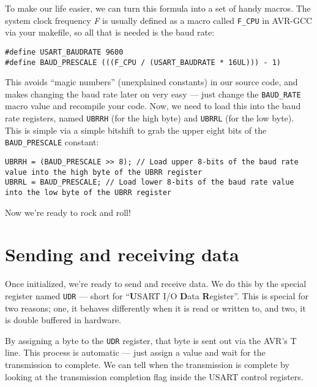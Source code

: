 \documentclass[a4paper,oneside,notitlepage]{book}
\begin{document}
To make our life easier, we can turn this formula into a set of handy macros. The system clock frequency \emph{F} is usually defined as a macro called \texttt{F\_CPU} in AVR-GCC via your makefile, so all that is needed is the baud rate:

\begin{center}
\begin{lstlisting}
#define USART_BAUDRATE 9600
#define BAUD_PRESCALE (((F_CPU / (USART_BAUDRATE * 16UL))) - 1)
\end{lstlisting}
\end{center}

This avoids ``magic numbers'' (unexplained constants) in our source code, and makes changing the baud rate later on very easy --- just change the \texttt{BAUD\_RATE} macro value and recompile your code. Now, we need to load this into the baud rate registers, named \texttt{UBRRH} (for the high byte) and \texttt{UBRRL} (for the low byte). This is simple via a simple bitshift to grab the upper eight bits of the \texttt{BAUD\_PRESCALE} constant:

\begin{center}
\begin{lstlisting}
UBRRH = (BAUD_PRESCALE >> 8); // Load upper 8-bits of the baud rate value into the high byte of the UBRR register
UBRRL = BAUD_PRESCALE; // Load lower 8-bits of the baud rate value into the low byte of the UBRR register
\end{lstlisting}
\end{center}

Now we're ready to rock and roll!


\chapter{Sending and receiving data}

Once initialized, we're ready to send and receive data. We do this by the special register named \texttt{UDR} --- short for ``\textbf{U}SART I/O \textbf{D}ata \textbf{R}egister''. This is special for two reasons; one, it behaves differently when it is read or written to, and two, it is double buffered in hardware.

By assigning a byte to the \texttt{UDR} register, that byte is sent out via the AVR's T line. This process is automatic --- just assign a value and wait for the transmission to complete. We can tell when the transmission is complete by looking at the transmission completion flag inside the USART control registers.
\end{document}
